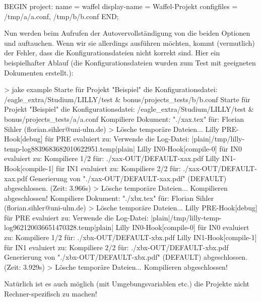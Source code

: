 \begin{bemerkung}
\begin{gepard}
BEGIN project:
    name          = waffel
    display-name  = Waffel-Projekt
    configfiles   = /tmp/a/a.conf, /tmp/b/b.conf
END;
\end{gepard}
Nun werden beim Aufrufen der Autovervollständigung von \Jake die beiden Optionen  und  auftauchen. Wenn wir sie allerdings ausführen möchten, kommt (vermutlich) der Fehler, dass die Konfigurationsdateien nicht korrekt sind.
Hier ein beispielhafter Ablauf (die Konfigurationsdateien wurden zum Test mit geeigneten Dokumenten erstellt.):
{
\begin{plainbash}
> jake example
Starte für Projekt "Beispiel" die Konfigurationsdatei: /eagle_extra/Studium/LILLY/test & bonus/projects_tests/b/b.conf
Starte für Projekt "Beispiel" die Konfigurationsdatei: /eagle_extra/Studium/LILLY/test & bonus/projects_tests/a/a.conf
Kompiliere Dokument: "./xax.tex" für: Florian Sihler (florian.sihler@uni-ulm.de)
> Lösche temporäre Dateien...
Lilly PRE-Hook[debug] für PRE evaluiert zu: Verwende die Log-Datei: |plain|/tmp/lilly-temp-log8839683682010622951.temp|plain|
Lilly IN0-Hook[compile-0] für IN0 evaluiert zu: Kompiliere 1/2 für: ./xax-OUT/DEFAULT-xax.pdf
Lilly IN1-Hook[compile-1] für IN1 evaluiert zu: Kompiliere 2/2 für: ./xax-OUT/DEFAULT-xax.pdf
Generierung von "./xax-OUT/DEFAULT-xax.pdf" (DEFAULT) abgeschlossen. (Zeit: 3.966s)
> Lösche temporäre Dateien...
Kompilieren abgeschlossen!
Kompiliere Dokument: "./xbx.tex" für: Florian Sihler (florian.sihler@uni-ulm.de)
> Lösche temporäre Dateien...
Lilly PRE-Hook[debug] für PRE evaluiert zu: Verwende die Log-Datei: |plain|/tmp/lilly-temp-log962120036651470328.temp|plain|
Lilly IN0-Hook[compile-0] für IN0 evaluiert zu: Kompiliere 1/2 für: ./xbx-OUT/DEFAULT-xbx.pdf
Lilly IN1-Hook[compile-1] für IN1 evaluiert zu: Kompiliere 2/2 für: ./xbx-OUT/DEFAULT-xbx.pdf
Generierung von "./xbx-OUT/DEFAULT-xbx.pdf" (DEFAULT) abgeschlossen. (Zeit: 3.929s)
> Lösche temporäre Dateien...
Kompilieren abgeschlossen!
\end{plainbash}
}
Natürlich ist es auch möglich (mit Umgebungsvariablen etc.) die Projekte nicht Rechner-spezifisch zu machen!
\end{bemerkung}

